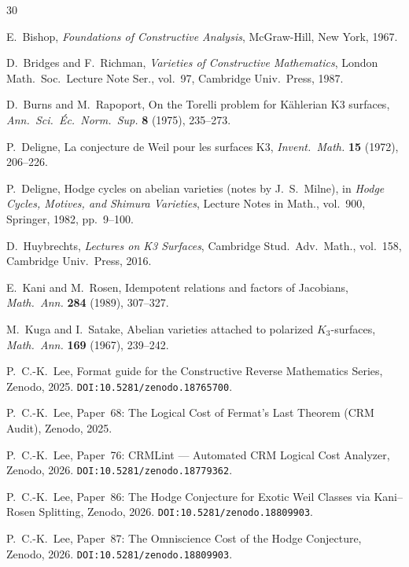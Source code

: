 \documentclass[11pt,a4paper]{article}
\theoremstyle{plain}
\theoremstyle{definition}
\begin{document}
\begin{thebibliography}{30}

E.~Bishop,
\emph{Foundations of Constructive Analysis},
McGraw-Hill, New York, 1967.

D.~Bridges and F.~Richman,
\emph{Varieties of Constructive Mathematics},
London Math.\ Soc.\ Lecture Note Ser., vol.~97, Cambridge Univ.\ Press, 1987.

D.~Burns and M.~Rapoport,
On the Torelli problem for K\"ahlerian K3 surfaces,
\emph{Ann.\ Sci.\ \'Ec.\ Norm.\ Sup.} \textbf{8} (1975), 235--273.

P.~Deligne,
La conjecture de Weil pour les surfaces K3,
\emph{Invent.\ Math.} \textbf{15} (1972), 206--226.

P.~Deligne,
Hodge cycles on abelian varieties (notes by J.~S.~Milne),
in \emph{Hodge Cycles, Motives, and Shimura Varieties}, Lecture Notes in Math., vol.~900, Springer, 1982, pp.~9--100.

D.~Huybrechts,
\emph{Lectures on K3 Surfaces},
Cambridge Stud.\ Adv.\ Math., vol.~158, Cambridge Univ.\ Press, 2016.

E.~Kani and M.~Rosen,
Idempotent relations and factors of Jacobians,
\emph{Math.\ Ann.} \textbf{284} (1989), 307--327.

M.~Kuga and I.~Satake,
Abelian varieties attached to polarized $K_3$-surfaces,
\emph{Math.\ Ann.} \textbf{169} (1967), 239--242.

P.~C.-K.~Lee,
Format guide for the Constructive Reverse Mathematics Series,
Zenodo, 2025. \texttt{DOI:10.5281/zenodo.18765700}.

P.~C.-K.~Lee,
Paper~68: The Logical Cost of Fermat's Last Theorem (CRM Audit),
Zenodo, 2025.

P.~C.-K.~Lee,
Paper~76: CRMLint --- Automated CRM Logical Cost Analyzer,
Zenodo, 2026. \texttt{DOI:10.5281/zenodo.18779362}.

P.~C.-K.~Lee,
Paper~86: The Hodge Conjecture for Exotic Weil Classes via Kani--Rosen Splitting,
Zenodo, 2026. \texttt{DOI:10.5281/zenodo.18809903}.

P.~C.-K.~Lee,
Paper~87: The Omniscience Cost of the Hodge Conjecture,
Zenodo, 2026. \texttt{DOI:10.5281/zenodo.18809903}.


\end{thebibliography}
\end{document}
